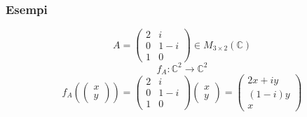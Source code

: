 \documentclass[a4paper]{article}
\theoremstyle{break}
\theoremstyle{break}
\theoremstyle{break}
\theoremstyle{break}
\begin{document}
\subsubsection{Esempi}
\begin{figure}[H]
  \begin{example}
    \[
    A = \begin{pmatrix} 
      2 & i\\
      0 & 1-i \\
      1 & 0
    \end{pmatrix} \in M_{3 \times 2}(\mathbb{C})
    \] 
    \[
    f_A: \mathbb{C}^2 \to \mathbb{C}^2
    \] 
    \[
    f_A\left( \begin{pmatrix} x\\y \end{pmatrix}  \right) =
    \begin{pmatrix} 
      2 & i\\
      0 & 1-i \\
      1 & 0
    \end{pmatrix} 
    \begin{pmatrix} x\\y \end{pmatrix} 
    =
    \begin{pmatrix} 
      2x + iy\\
      (1-i)y\\
      x
    \end{pmatrix} 
    \] 
  \end{example}
\end{figure}
\end{document}

